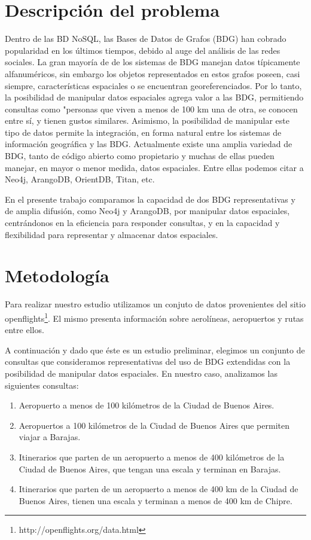 \documentclass{llncs}
\begin{document}
\section{Descripción del problema}
\vspace{-0.5em}
Dentro de las BD NoSQL, las Bases de Datos de Grafos (BDG) han cobrado popularidad en los últimos tiempos, debido al auge del análisis de las redes sociales.
La gran mayoría de de los sistemas de BDG manejan datos típicamente alfanuméricos, sin embargo los objetos representados en estos grafos poseen, casi siempre, características espaciales o se encuentran georeferenciados.
Por lo tanto, la posibilidad de manipular datos espaciales agrega valor a las BDG, permitiendo consultas como "personas que viven a menos de 100 km una de otra, se conocen entre sí, y tienen gustos similares.
Asimismo, la posibilidad de manipular este tipo de datos permite la integración, en forma natural entre los sistemas de información geográfica y las BDG.
Actualmente existe una amplia variedad de BDG, tanto de código abierto como propietario y muchas de ellas pueden manejar, en mayor o menor medida, datos espaciales. Entre ellas podemos citar a Neo4j\cite{n4jsp}, ArangoDB\cite{adbgi}, OrientDB, Titan, etc.

En el presente trabajo comparamos la capacidad de dos BDG representativas y de amplia difusión, como Neo4j y ArangoDB, por manipular datos espaciales, centrándonos en la eficiencia para responder consultas, y en la capacidad y flexibilidad para representar y almacenar datos espaciales.

\section{Metodología}
\vspace{-0.5em}
Para realizar nuestro estudio utilizamos un conjuto de datos provenientes del sitio  openflights\footnote{http://openflights.org/data.html}. El mismo presenta información sobre aerolíneas, aeropuertos y rutas entre ellos.

A continuación y dado que éste es un estudio preliminar, elegimos un conjunto de consultas que consideramos representativas del uso de BDG extendidas con la posibilidad de manipular datos espaciales. En nuestro caso, analizamos las siguientes consultas:
\vspace{-0.5em}
\begin{enumerate}
\itemsep0em 
\item Aeropuerto a menos de 100 kilómetros de la Ciudad de Buenos Aires.
\item Aeropuertos a 100 kilómetros de la Ciudad de Buenos Aires que permiten viajar a Barajas.
\item Itinerarios que parten de un aeropuerto a menos de 400 kilómetros de la Ciudad de Buenos Aires, que tengan una escala y terminan en Barajas.
\item Itinerarios que parten de un aeropuerto a menos de 400 km de la Ciudad de Buenos Aires, tienen una escala y terminan a menos de 400 km de Chipre.
\end{enumerate}
\end{document}
